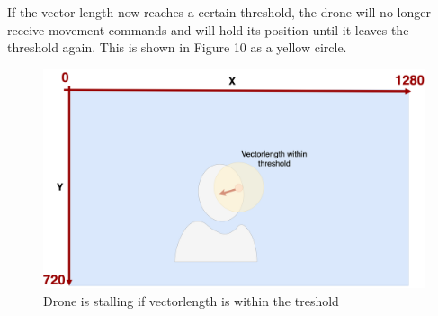 \documentclass[a4paper,11pt,singlespacing]{article}
\begin{document}
If the vector length now reaches a certain threshold, the drone will no longer receive movement commands and 
will hold its position until it leaves the threshold again.
This is shown in Figure 10 as a yellow circle.

\begin{figure}[H]
	\centering
	\includegraphics[width=\textwidth]{images/vectorlength_between_treshold.png}
	\caption{Drone is stalling if vectorlength is within the treshold}
	\label{vectorlength_treshold}
\end{figure}



\pagebreak
\end{document}
